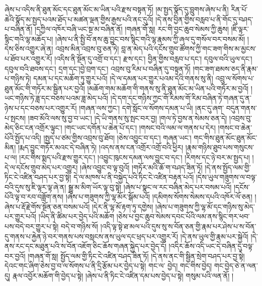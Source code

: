 ཞེས་པ་འདིས་ནི་ཐུན་མོང་དང་ཐུན་མོང་མ་ཡིན་པའི་རྫས་བསྟན་ཏོ། །མ་སྤྱད་སྣོད་དུ་བླུགས་ཞེས་པ་ནི། རིན་པོ་ཆེའི་སྣོད་མ་སྤྱད་པའམ་ཐོད་པ་མཚན་ལྡན་གྱིས་རྒྱས་པའི་ནང་དུའོ། །དེ་ནས་བྱིན་གྱིས་བརླབ་པ་ནི་གོང་དུ་བཤད་པ་བཞིན་ནོ། །དཀྱིལ་འཁོར་བཞི་ཡང་སྔ་མ་བཞིན་ནོ། །གཞན་གོ་སླ། རང་གི་བྱང་ཆུབ་སེམས་ཀྱི་ཆུས། །ཇི་ལྟར་སྙིང་གའི་ལྷ་མཆོད་པ། །ཞེས་པ་ནི་སྤྱི་བོ་ནས་ཆུ་བྱུང་བས་སྙིང་གའི་ལྷ་རྣམས་ཀྱི་ཞལ་དུ་གསོལ་བར་བསམ་མོ། །དེས་ཅིས་འགྱུར་ཞེ་ན། འབྲས་མིན་འབྲས་བུ་ཅན་ཏེ། བླ་ན་མེད་པའི་དངོས་གྲུབ་ཚོགས་ཀྱི་གང་ཟག་གིས་མ་མྱངས་པ་ཐོབ་པར་འགྱུར་རོ། །འདིས་ནི་སྔོན་དུ་འགྲོ་བ་དང་། རྫས་དང་། བྱིན་གྱིས་བརླབ་པ་དང་། དབུལ་བའི་ཡུལ་དང་། དབུལ་བའི་ཐབས་དང་། དྲག་དང་།བྱེ་བྲག་དང་། འབྲས་བུ་རིམ་པ་བཞིན་དུ་བསྟན་ཏོ། །གང་ཟག་ཐམས་ཅད་ནི་རྣམ་པ་གཉིས་ཏེ། དམན་པ་དང་མཆོག་ཏུ་གྱུར་པའོ། །དེ་ལ་དམན་པར་གྱུར་པའམ་དེའི་གནས་སུ་ནི། འབྲུ་ལ་སོགས་པ་ཐུན་མོང་གི་གཏོར་མ་སྦྱིན་པར་བྱའོ། །མཆོག་གམ་མཆོག་གི་གནས་སུ་ནི་ཐུན་མོང་མ་ཡིན་པའི་གཏོར་མ་བྱའོ། །ཡང་གཉིས་ཏེ་ཟླ་དང་བཅས་པའམ་ཟླ་མེད་པའོ། །དེ་དག་དང་གཉིས་ཀྱང་{གོ་རིམས་གོ་རིམ་}བཞིན་ཏེ་གཞན་དུ་ན་ཉེས་པ་དང་བཅས་པར་འགྱུར་རོ། །གཞན་ལས་ཀྱང་། དགེ་སློང་ལ་སོགས་དམན་པ་ཡི། །ནང་དུ་ཞག་​ བདུན་གནས་པ་སྤངས། །ཟབ་མོའི་ལས་སུ་བྱ་བ་ཡང་། །དེ་ཡི་གནས་སུ་སྤང་བར་བྱ། །གལ་ཏེ་བྱས་ན་སེམས་ཅན་དེ། །འབྲས་བུ་མེད་ཅིང་ངན་འགྲོར་ལྟུང་། །གང་ཡང་དགོན་པ་ཆེན་པོ་དང་། །གསང་བའི་ལམ་ལ་གནས་པ་དེར། །གསང་བ་ཆེན་པོའི་སྤྱོད་པ་འདི། །སྤྱད་པ་ཙམ་གྱིས་འབྲས་བུ་ཐོབ། །ཅེས་འབྱུང་བ་དང་། གཞན་ཡང་། གང་གིས་ཐུན་མོང་ཐུན་མོང་མིན། །རྨད་བྱུང་གཏོར་མའང་དེ་བཞིན་ཏེ། །འདས་ནས་ངན་འགྲོར་འགྲོ་བའི་ཕྱིར། །རྣམ་གཉིས་ཐུབ་པས་གསུངས་པ་ལ། །རང་གིས་སྨད་པའི་རྫས་གྱུར་དང་། །འབྱུང་ཁུངས་དམན་ལས་བྱུང་བ་དང་། །རིགས་དང་ཉེ་བར་མ་སྤྱད་པ། །དེ་ལ་དངོས་གྲུབ་མེད་པར་འགྱུར། །ཞེས་འབྱུང་བ་ལྟ་བུའོ། །གཏོར་མའི་ཆོ་ག་བཤད་ཟིན་ཏོ། །དེ་ནས་སྤྱོད་ལམ་གྱི་ཏིང་ངེ་འཛིན་བཤད་པར་བྱ་སྟེ། དེ་ལ་མཁས་པ་ནི་བསྐྱེད་པའི་ཏིང་ངེ་འཛིན་བརྟན་པའོ། །དེས་ཡུལ་གཟུགས་ལ་བལྟ་བའི་དུས་སུ་ཇི་ལྟར་ལྟ་ཞེ་ན། སྒྱུ་མ་མིག་ཡོར་ལྟ་བུ་སྟེ། །ཞེས་པ་སྣང་ལ་རང་བཞིན་མེད་པར་བསམ་པའོ། །དངོས་པོའི་ལྟ་བ་རབ་བཟློག་ནས། །ཞེས་པ་གཟུགས་ཀྱི་ལྷ་མོར་སྒོམ་པའོ། །དམིགས་སོགས་སེམས་དཔའི་འཁོར་ལོ་ཅན། །ཞེས་པ་རྡོ་རྗེ་གོས་སྔོན་ཅན་བསམ་པའོ། །དེར་ནི་ལྷ་མོ་རྟག་ཏུ་དགྱེས། །ཞེས་པ་གཟུགས་ཀྱི་ལྷ་མོ་དང་གཉིས་སུ་མེད་པར་གྱུར་པའོ། །ཡིད་ནི་ཚིམ་པར་བྱེད་པའི་མཆོག །ཅེས་པ་བྱང་ཆུབ་སེམས་དབང་པོའི་ལམ་ནས་སྙིང་གར་ཕབ་པས་བདེ་བར་གྱུར་པ་སྟེ། བདེ་བ་གཉིས་སོ། །འདི་ལྟ་སྟེ་ཐ་མལ་པའི་དུས་སུ་ས་བོན་ཅན་གྱི་རྣམ་པར་ཤེས་པ་ས་བོན་དུ་གནས་པ་རྐྱེན་ཉེ་བར་གནས་པས་བསླངས་ནས་ཡུལ་དང་ཕྲད་པར་འགྱུར་རོ། །དེ་ནས་ཡུལ་གྱི་རྣམ་པར་སྐྱེའོ། །དེ་ནས་རང་དང་མཐུན་པའི་ས་བོན་འཇོག་ཅིང་ཆོས་གཞན་སྐྱེད་པར་བྱེད་དོ། །འདིར་ཆོས་འདི་ཡང་དེ་བཞིན་དུ་བལྟ་བར་བྱའོ། །གཞན་གོ་སླ། སྤྱོད་ལམ་གྱི་ཏིང་ངེ་འཛིན་བཤད་ཟིན་ཏོ། །དེ་ནས་ནང་གི་སྦྱིན་སྲེག་བཤད་པར་བྱ་སྟེ། དེའང་གང་ཞིག་ཅེས་བྱ་བ་ལ་སོགས་པ་ནི་དྲི་རྩོམ་པར་བྱེད་པ་སྟེ། གང་ལ་​ བྱེད། གང་གིས་བྱེད། གང་བྱེད་ཅེ་ན་ལན་དུ། རྣལ་འབྱོར་མཆོག་གི་བྱེད་པ་སྟེ། །ཞེས་པ་ནི་ཏིང་ངེ་འཛིན་དམ་པས་བྱེད་པ་སྟེ། གསུམ་པའི་ལན་ནོ། །
